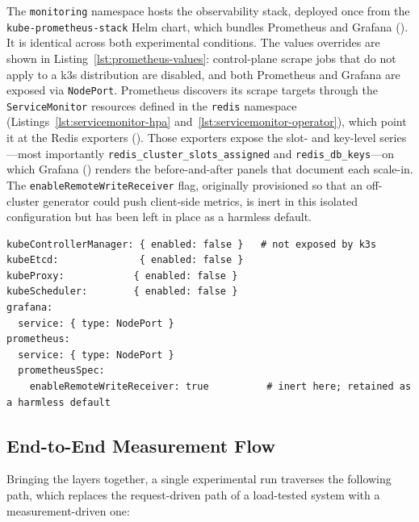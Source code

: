 The \texttt{monitoring} namespace hosts the observability stack, deployed once from the
\texttt{kube-prometheus-stack} Helm chart, which bundles Prometheus and Grafana
(\cite{artifacthub:kube-prometheus-stack}). It is identical across both experimental
conditions. The values overrides are shown in Listing~\ref{lst:prometheus-values}:
control-plane scrape jobs that do not apply to a k3s distribution are disabled, and both
Prometheus and Grafana are exposed via \texttt{NodePort}. Prometheus discovers its scrape
targets through the \texttt{ServiceMonitor} resources defined in the \texttt{redis} namespace
(Listings~\ref{lst:servicemonitor-hpa} and~\ref{lst:servicemonitor-operator}), which point it
at the Redis exporters (\cite{prometheus:overview}). Those exporters expose the slot- and
key-level series---most importantly \texttt{redis\_cluster\_slots\_assigned} and
\texttt{redis\_db\_keys}---on which Grafana (\cite{grafana:github}) renders the before-and-after
panels that document each scale-in. The \texttt{enableRemoteWriteReceiver} flag, originally
provisioned so that an off-cluster generator could push client-side metrics, is inert in this
isolated configuration but has been left in place as a harmless default.

\begin{lstlisting}[caption={\texttt{kube-prometheus-stack} Helm values (\texttt{my-prometheus-values.yaml}).},label={lst:prometheus-values}]
kubeControllerManager: { enabled: false }   # not exposed by k3s
kubeEtcd:              { enabled: false }
kubeProxy:            { enabled: false }
kubeScheduler:        { enabled: false }
grafana:
  service: { type: NodePort }
prometheus:
  service: { type: NodePort }
  prometheusSpec:
    enableRemoteWriteReceiver: true          # inert here; retained as a harmless default
\end{lstlisting}

\subsection{End-to-End Measurement Flow}
\label{subsec:data-flow}

Bringing the layers together, a single experimental run traverses the following path, which
replaces the request-driven path of a load-tested system with a measurement-driven one:

